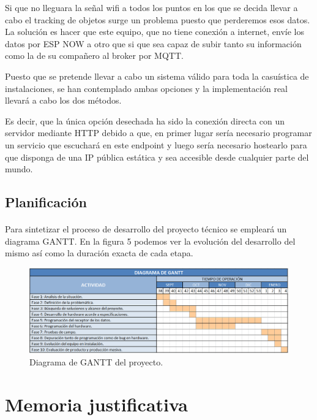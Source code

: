 \documentclass[paper=a4, fontsize=11pt,twoside]{scrartcl}	%
\begin{document}
        Si que no lleguara la señal wifi a todos los puntos en los que se decida llevar a cabo el tracking de objetos 
        surge un problema puesto que perderemos esos datos. La solución es hacer que este equipo, que no tiene conexión a internet,
        envíe los datos por ESP NOW a otro que si que sea capaz de subir tanto su información como la de su compañero al broker por MQTT.

        Puesto que se pretende llevar a cabo un sistema válido para toda la casuística de instalaciones, se han contemplado ambas opciones
        y la implementación real llevará a cabo los dos métodos.
        
        Es decir, que la única opción desechada ha sido la conexión directa con un servidor mediante HTTP debido a que, en primer
        lugar sería necesario programar un servicio que escuchará en este endpoint y luego sería necesario hostearlo 
        para que disponga de una IP pública estática y sea accesible desde cualquier parte del mundo.
    \subsection{Planificación}
        \paragraph{}
        Para sintetizar el proceso de desarrollo del proyecto técnico se empleará un diagrama GANTT. En la
        figura 5 podemos ver la evolución del desarrollo del mismo así como la duración exacta de cada etapa. 
        \begin{center}
            \begin{figure}[ht]
                \centering
                \includegraphics[width=1\textwidth]{diagrama de gantt.PNG}
                \caption{Diagrama de GANTT del proyecto.}
                \label{fig:mesh18}
            \end{figure}
        \end{center} 
\section{Memoria justificativa}
\end{document}
